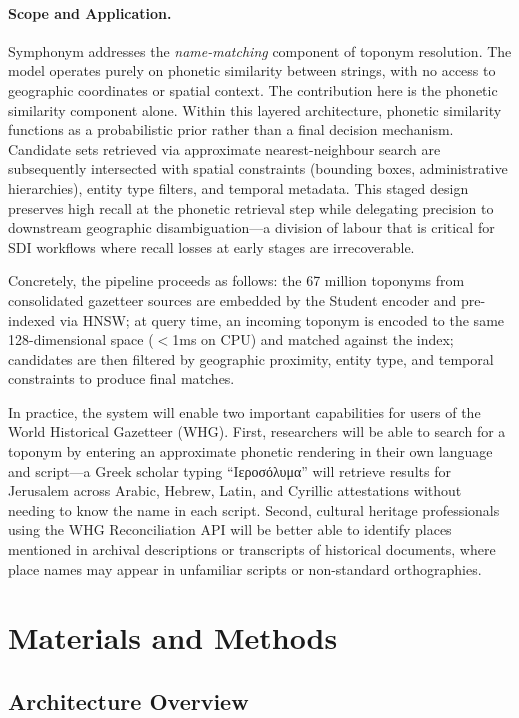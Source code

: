 \documentclass[11pt,a4paper]{article}
\begin{document}
\paragraph{Scope and Application.} Symphonym addresses the \emph{name-matching} component of toponym resolution. The model operates purely on phonetic similarity between strings, with no access to geographic coordinates or spatial context. The contribution here is the phonetic similarity component alone. Within this layered architecture, phonetic similarity functions as a probabilistic prior rather than a final decision mechanism. Candidate sets retrieved via approximate nearest-neighbour search are subsequently intersected with spatial constraints (bounding boxes, administrative hierarchies), entity type filters, and temporal metadata. This staged design preserves high recall at the phonetic retrieval step while delegating precision to downstream geographic disambiguation---a division of labour that is critical for SDI workflows where recall losses at early stages are irrecoverable.

Concretely, the pipeline proceeds as follows: the 67 million toponyms from consolidated gazetteer sources are embedded by the Student encoder and pre-indexed via HNSW; at query time, an incoming toponym is encoded to the same 128-dimensional space ($<$1ms on CPU) and matched against the index; candidates are then filtered by geographic proximity, entity type, and temporal constraints to produce final matches.

In practice, the system will enable two important capabilities for users of the World Historical Gazetteer (WHG). First, researchers will be able to search for a toponym by entering an approximate phonetic rendering in their own language and script---a Greek scholar typing ``Ιεροσόλυμα'' will retrieve results for Jerusalem across Arabic, Hebrew, Latin, and Cyrillic attestations without needing to know the name in each script. Second, cultural heritage professionals using the WHG Reconciliation API will be better able to identify places mentioned in archival descriptions or transcripts of historical documents, where place names may appear in unfamiliar scripts or non-standard orthographies.


\section{Materials and Methods}
\label{sec:methods}

\subsection{Architecture Overview}
\end{document}
